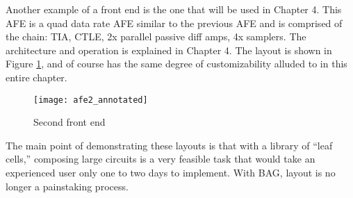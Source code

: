 Another example of a front end is the one that will be used in Chapter 4. This AFE is a quad data rate AFE similar to the previous AFE and is comprised of the chain: TIA, CTLE, 2x parallel passive diff amps, 4x samplers. The architecture and operation is explained in Chapter 4. The layout is shown in Figure \ref{fig:afe2}, and of course has the same degree of customizability alluded to in this entire chapter.
\begin{figure}[h]
\centering
\texttt{[image: afe2\_annotated]}
\caption{Second front end}
\label{fig:afe2}
\end{figure}
The main point of demonstrating these layouts is that with a library of ``leaf cells,'' composing large circuits is a very feasible task that would take an experienced user only one to two days to implement. With BAG, layout is no longer a painstaking process.


